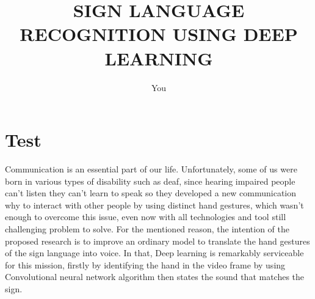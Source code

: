 \documentclass[a4paper,man,natbib]{apa6}
\title{SIGN LANGUAGE RECOGNITION USING DEEP LEARNING}
\author{You}
\affiliation{df}
\begin{document}
\maketitle

\section{Test}
Communication is an essential part of our life. Unfortunately, some of us were born in
various types of disability such as deaf, since hearing impaired people can’t listen they can’t
learn to speak so they developed a new communication why to interact with other people by
using distinct hand gestures, which wasn’t enough to overcome this issue, even now with all
technologies and tool still challenging problem to solve. For the mentioned reason, the
intention of the proposed research is to improve an ordinary model to translate the hand
gestures of the sign language into voice.
In that, Deep learning is remarkably serviceable for this mission, firstly by identifying the
hand in the video frame by using Convolutional neural network algorithm then states the
sound that matches the sign.
\end{document}
